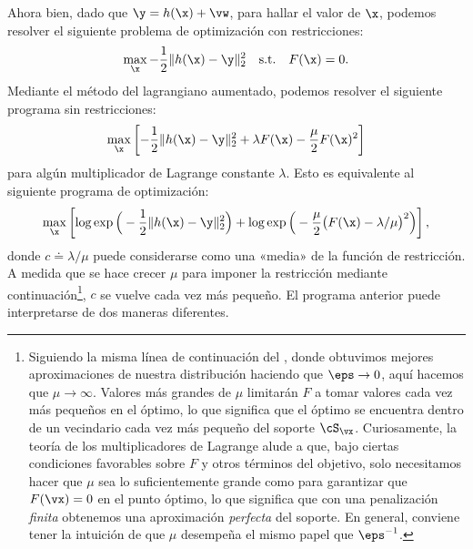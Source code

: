 \documentclass[../../book-main_es.tex]{subfiles}
\begin{document}
Ahora bien, dado que $\y = h(\x) +\vw$, para hallar el valor de $\x$, podemos resolver el
siguiente problema de optimización con restricciones:
\begin{equation}
    \max_{\x} - \frac{1}{2}\|h(\x) - \y\|_2^2 \quad \mbox{s.t.} \quad
    F(\x) = {0}.
\end{equation}
Mediante el método del lagrangiano aumentado, podemos resolver el
siguiente programa sin restricciones:
\begin{equation}
    \max_{\x} \left[-\frac{1}{2}\|h(\x) - \y\|_2^2  + \lambda F(\x) -
    \frac{\mu}{2} F(\x)^2\right]
\end{equation}
para algún multiplicador de Lagrange constante $\lambda$.
Esto es equivalente al siguiente programa de optimización:
\begin{equation}\label{eq:lagrange_multiplier_continuation}
    \max_{\x} \left[\log \exp\Big(- \frac{1}{2}\|h(\x) -
        \y\|_2^2\Big) + \log \exp\Big( - \frac{\mu}{2} \big(F(\x) -
    \lambda/\mu\big)^2\Big)\right],
\end{equation}
donde $c \doteq {\lambda}/{\mu}$ puede considerarse como una «media» de la
función de restricción. A medida que se hace crecer $\mu$ para imponer la 
restricción mediante continuación\footnote{Siguiendo la misma línea de
    continuación del , donde obtuvimos mejores
    aproximaciones de nuestra distribución haciendo que \(\eps \to 0\), aquí hacemos que
    \(\mu \to \infty\). Valores más grandes de \(\mu\) limitarán
    \(F\) a tomar valores cada vez más pequeños en el óptimo, lo que significa que
    el óptimo se encuentra dentro de un vecindario cada vez más pequeño del
    soporte \(\cS_{\vx}\). Curiosamente, la teoría de los multiplicadores de Lagrange
    alude a que, bajo ciertas condiciones favorables sobre \(F\) y
    otros términos del objetivo, solo necesitamos hacer que \(\mu\) sea lo suficientemente grande
    como para garantizar que \(F(\vx) = 0\) en el punto óptimo, lo que significa que
    con una penalización \textit{finita} obtenemos una aproximación \textit{perfecta} del
    soporte. En general, conviene tener la intuición de que \(\mu\)
desempeña el mismo papel que \(\eps^{-1}\).}, $c$ se vuelve cada vez
más pequeño. El programa anterior puede interpretarse de dos maneras diferentes.
\end{document}
